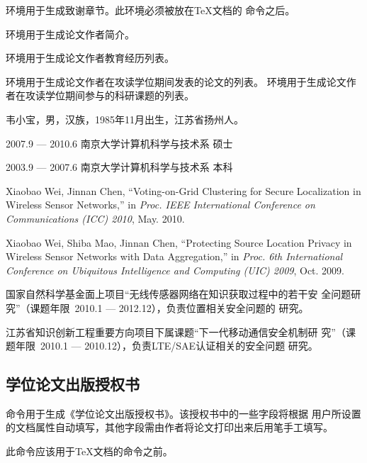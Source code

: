 环境用于生成致谢章节。此环境必须被放在{\TeX}文档的
命令之后。

环境用于生成论文作者简介。

环境用于生成论文作者教育经历列表。

环境用于生成论文作者在攻读学位期间发表的论文的列表。
环境用于生成论文作者在攻读学位期间参与的科研课题的列表。

\begin{tex}
\begin{resume}
\begin{authorinfo}
\noindent 韦小宝，男，汉族，1985年11月出生，江苏省扬州人。
\end{authorinfo}
\begin{education}
\item[2007.9 --- 2010.6] 南京大学计算机科学与技术系 \hfill 硕士
\item[2003.9 --- 2007.6] 南京大学计算机科学与技术系 \hfill 本科
\end{education}
\begin{publications}
\item Xiaobao Wei, Jinnan Chen, ``Voting-on-Grid Clustering 
  for Secure Localization in Wireless Sensor Networks,'' in 
  \textsl{Proc. IEEE International Conference on Communications
   (ICC) 2010}, May. 2010.
\item Xiaobao Wei, Shiba Mao, Jinnan Chen, ``Protecting Source
  Location Privacy in Wireless Sensor Networks with Data 
  Aggregation,'' in \textsl{Proc. 6th International Conference 
  on Ubiquitous Intelligence and Computing (UIC) 2009}, Oct.
   2009.
\end{publications}
\begin{projects}
\item 国家自然科学基金面上项目``无线传感器网络在知识获取过程中的若干安
 全问题研究''（课题年限~2010.1 --- 2012.12），负责位置相关安全问题的
 研究。
\item 江苏省知识创新工程重要方向项目下属课题``下一代移动通信安全机制研
 究''（课题年限~2010.1 --- 2010.12），负责LTE/SAE认证相关的安全问题
 研究。
\end{projects}
\end{resume}
\end{tex}


\subsection{学位论文出版授权书}

命令用于生成《学位论文出版授权书》。该授权书中的一些字段将根据
用户所设置的文档属性自动填写，其他字段需由作者将论文打印出来后用笔手工填写。

此命令应该用于{\TeX}文档的命令之前。

\begin{tex}
\makelicense
\end{tex}
